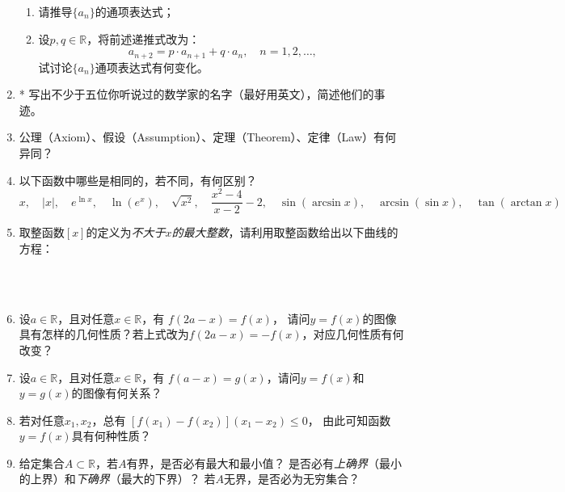 \begin{enumerate}
  \begin{enumerate}[(1)]
    \item 请推导$\{a_n\}$的通项表达式；
    \item 设$p,q\in\mathbb{R}$，将前述递推式改为：
    $$a_{n+2}=p\cdot a_{n+1}+q\cdot a_{n},\quad n=1,2,\ldots,$$
    试讨论$\{a_n\}$通项表达式有何变化。
  \end{enumerate}
  \item* 写出不少于五位你听说过的数学家的名字（最好用英文），简述他们的事迹。
  \item 公理（Axiom）、假设（Assumption）、定理（Theorem）、定律（Law）有何异同？
  \item 以下函数中哪些是相同的，若不同，有何区别？
  $$x,\quad |x|,\quad e^{\ln x},\quad \ln(e^x),\quad \sqrt{x^2},\quad
	\frac{x^2-4}{x-2}-2,\quad
  \sin(\arcsin x),\quad \arcsin(\sin x), \quad \tan(\arctan x)$$
  \item 取整函数$[x]$的定义为{\it 不大于$x$的最大整数}，请利用取整函数给出以下曲线的方程：
  \begin{center}
	\\
	\\
  \end{center}
  \item 设$a\in\mathbb{R}$，且对任意$x\in\mathbb{R}$，有
  $f(2a-x)=f(x)$，
  请问$y=f(x)$的图像具有怎样的几何性质？若上式改为$f(2a-x)=-f(x)$，对应几何性质有何改变？
  \item 设$a\in\mathbb{R}$，且对任意$x\in\mathbb{R}$，有
  $f(a-x)=g(x)$，请问$y=f(x)$和$y=g(x)$的图像有何关系？
  \item 若对任意$x_1,x_2$，总有
  $[f(x_1)-f(x_2)](x_1-x_2)\leq 0$，
  由此可知函数$y=f(x)$具有何种性质？
  \item 给定集合$A\subset\mathbb{R}$，若$A$有界，是否必有最大和最小值？
  是否必有{\it 上确界}（最小的上界）和{\it 下确界}（最大的下界）？
  若$A$无界，是否必为无穷集合？
\end{enumerate}